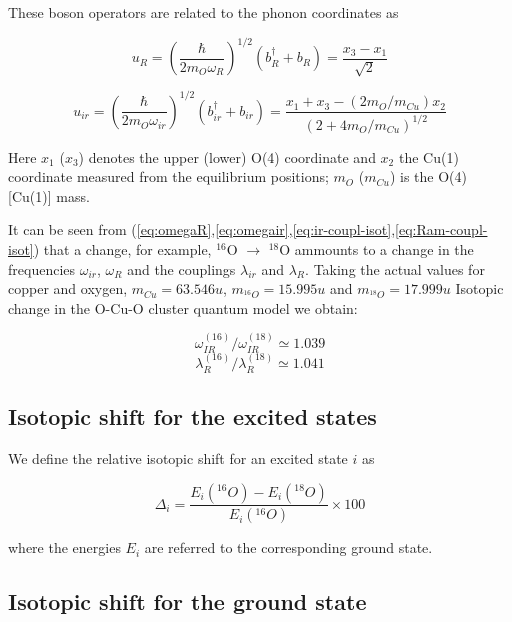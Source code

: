 These boson operators are related to the phonon coordinates as

\begin{equation}\label{eq:Ram-coord}
u_R = \left(\frac{\hbar}{2m_O \omega_R}\right)^{1/2}(b_R^\dagger + b_R) = \frac{x_3 - x_1}{\sqrt{2}}
\end{equation}

\begin{equation}\label{eq:ir-coord}
u_{ir} = \left(\frac{\hbar}{2m_O \omega_{ir}}\right)^{1/2}(b_{ir}^\dagger + b_{ir}) = \frac{x_1 + x_3 - (2m_O/m_{Cu})x_2}{(2 + 4m_O/m_{Cu})^{1/2}}
\end{equation}

Here $x_1$ ($x_3$) denotes the upper (lower) O(4) coordinate and $x_2$  the Cu(1) coordinate measured from the equilibrium positions;   $m_O$ ($m_{Cu}$) is the O(4) [Cu(1)] mass.

It can be seen from (\ref{eq:omegaR},\ref{eq:omegair},\ref{eq:ir-coupl-isot},\ref{eq:Ram-coupl-isot}) that a change, for example, $^{16}$O $\rightarrow$ $^{18}$O ammounts to a change in the frequencies  $\omega_{ir}$, $\omega_R$ and the couplings $\lambda_{ir}$ and $\lambda_R$. Taking the actual values for copper and oxygen, $m_{Cu}=63.546u$, $m_{^{16}O}=15.995u$ and $m_{^{18}O}=17.999u$ Isotopic change in the O-Cu-O cluster quantum model we obtain:

\begin{equation}\label{eq:omega-ir-isot}
\omega^{(16)}_{IR} / \omega^{(18)}_{IR} \simeq 1.039
\end{equation}
\begin{equation}\label{eq:lambda-ir-isot}
\lambda_R^{(16)} / \lambda_R^{(18)} \simeq 1.041
\end{equation}


\subsection{Isotopic shift for the excited states}

We define the relative isotopic shift for an excited state $i$ as 

\begin{equation}\label{eq:isot-shift-def-exc}
\Delta_i = \frac{E_i(^{16}O)- E_i(^{18}O)}{E_i(^{16}O)} \times 100
\end{equation}

where the energies $E_i$ are referred to the corresponding ground state.

\subsection{Isotopic shift for the ground state}

